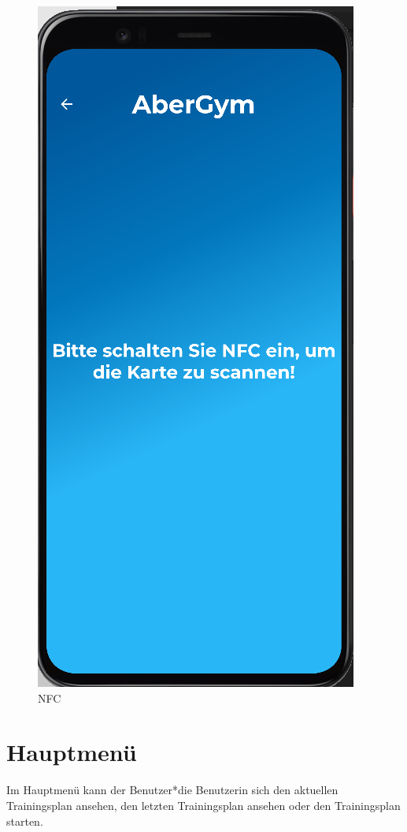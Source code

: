    \begin{figure}[H]
        \centering
        \includegraphics[scale=0.5]{pics/NFC.png}
        \caption{NFC}
    \end{figure}

    \newpage

    \section{Hauptmenü}
    \author{Antonio Kuvac}

    Im Hauptmenü kann der Benutzer*die Benutzerin sich den aktuellen Trainingsplan ansehen, den letzten Trainingsplan ansehen oder den Trainingsplan starten.

